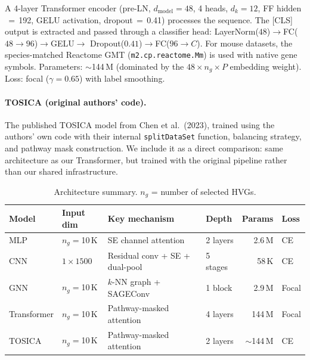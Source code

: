 \documentclass[11pt,letterpaper]{article}
\begin{document}
A 4-layer Transformer encoder (pre-LN, $d_{\text{model}}{=}48$, 4 heads,
$d_k{=}12$, FF hidden$\,{=}\,$192, GELU activation, dropout$\,{=}\,$0.41)
processes the sequence. The [CLS] output is extracted and passed through a
classifier head: LayerNorm($48$)$\to$FC($48 \to 96$)$\to$GELU$\to$%
Dropout($0.41$)$\to$FC($96 \to C$). For mouse datasets, the species-matched
Reactome GMT (\texttt{m2.cp.reactome.Mm}) is used with native gene symbols.
Parameters: ${\sim}$144\,M (dominated by the $48 \times n_g \times P$ embedding
weight). Loss: focal ($\gamma{=}0.65$) with label smoothing.

\paragraph{TOSICA (original authors' code).}
The published TOSICA model from Chen et al.\ (2023), trained using the authors'
own code with their internal \texttt{splitDataSet} function, balancing strategy,
and pathway mask construction. We include it as a direct comparison: same
architecture as our Transformer, but trained with the original pipeline rather
than our shared infrastructure.

\begin{table}[H]
\centering
\caption{Architecture summary. $n_g$ = number of selected HVGs.}
\label{tab:arch}
\footnotesize
\begin{tabular}{@{}llllrl@{}}
\toprule
Model & Input dim & Key mechanism & Depth & Params & Loss \\
\midrule
MLP         & $n_g{=}$10\,K & SE channel attention        & 2 layers   & 2.6\,M  & CE \\
CNN         & $1{\times}1500$ & Residual conv + SE + dual-pool & 5 stages & 58\,K   & CE \\
GNN         & $n_g{=}$10\,K & $k$-NN graph + SAGEConv     & 1 block    & 2.9\,M  & Focal \\
Transformer & $n_g{=}$10\,K & Pathway-masked attention    & 4 layers   & 144\,M  & Focal \\
TOSICA      & $n_g{=}$10\,K & Pathway-masked attention    & 2 layers   & ${\sim}$144\,M & CE \\
\bottomrule
\end{tabular}
\end{table}
\end{document}
